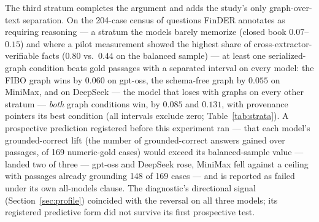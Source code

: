 \documentclass{article}
\begin{document}
The third stratum completes the argument and adds the study's only
graph-over-text separation. On the 204-case census of questions FinDER
annotates as requiring reasoning --- a stratum the models barely memorize
(closed book $0.07$--$0.15$) and where a pilot measurement showed the
highest share of cross-extractor-verifiable facts ($0.80$ vs.\ $0.44$ on
the balanced sample) --- at least one serialized-graph condition beats gold
passages with a separated interval on every model: the FIBO graph wins by
$0.060$ on gpt-oss, the schema-free graph by $0.055$ on MiniMax, and on
DeepSeek --- the model that loses with graphs on every other stratum ---
\emph{both} graph conditions win, by $0.085$ and $0.131$, with provenance
pointers its best condition (all intervals exclude zero;
Table~\ref{tab:strata}). A
prospective prediction registered before this experiment ran --- that each
model's grounded-correct lift (the number of grounded-correct answers
gained over passages, of 169 numeric-gold cases) would exceed its
balanced-sample value ---
landed two of three --- gpt-oss and DeepSeek rose, MiniMax fell against a
ceiling with passages already grounding 148 of 169 cases --- and is
reported as failed under its own all-models clause. The diagnostic's
directional signal (Section~\ref{sec:profile}) coincided with the
reversal on all three models; its registered predictive form did not
survive its first prospective test.
\end{document}
